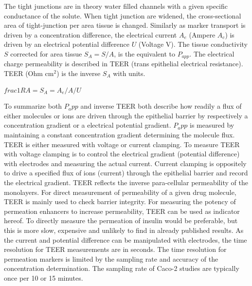 The tight junctions are in theory water filled channels with a given specific conductance of the solute. When tight junction are widened, the cross-sectional area of tight-junction per area tissue is changed. Similarly as marker transport is driven by a concentration difference, the electrical current $A_{e}$ (Ampere $A_c$) is driven by an electrical potential difference $U$ (Voltage V). The tissue conductivity $S$ corrected for area tissue $S_A = S/A$, is the equivalent to $P_{app}$. The electrical charge permeability is described in TEER (trans epithelial electrical resistance). TEER (Ohm cm$^2$) is the inverse $S_A$ with units.

$frac{1}{RA} = S_A = A_e/A / U \quad$

To summarize both $P_app$ and inverse TEER both describe how readily a flux of either molecules or ions are driven through the epithelial barrier by respectively a concentration gradient or a electrical potential gradient. $P_app$ is measured by maintaining a constant concentration gradient determining the molecule flux. TEER is either measured with voltage or current clamping. To measure TEER with voltage clamping is to control the electrical gradient (potential difference) with electrodes and measuring the actual current. Current clamping is oppositely to drive a specified flux of ions (current) through the epithelial barrier and record the electrical gradient. TEER reflects the inverse para-cellular permeability of the monolayers. For direct measurement of permeability of a given drug molecule, TEER is mainly used to check barrier integrity. For measuring the potency of permeation enhancers to increase permeability, TEER can be used as indicator hereof. To directly measure the permeation of insulin would be preferable, but this is more slow, expensive and unlikely to find in already published results. As the current and potential difference can be manipulated with electrodes, the time resolution for TEER measurements are in seconds. The time resolution for permeation markers is limited by the sampling rate and accuracy of the concentration determination. The sampling rate of Caco-2 studies are typically once per 10 or 15 minutes.



